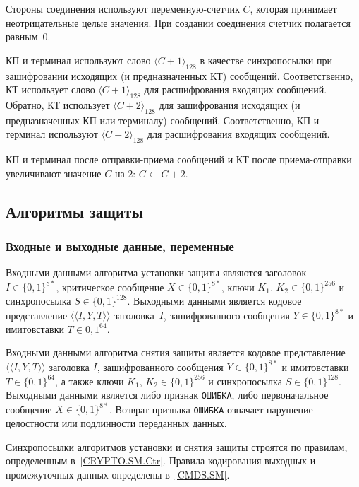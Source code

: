 Стороны соединения используют переменную-счетчик $C$, которая принимает 
неотрицательные целые значения. При создании соединения счетчик 
полагается равным~$0$.

КП и терминал используют слово $\langle C + 1 \rangle_{128}$ в качестве 
синхропосылки при зашифровании исходящих (и предназначенных КТ) сообщений. 
Соответственно, КТ использует слово $\langle C + 1 \rangle_{128}$ для 
расшифрования входящих сообщений. Обратно, КТ использует $\langle C + 2 
\rangle_{128}$ для зашифрования исходящих (и предназначенных КП или 
терминалу) сообщений. Соответственно, КП и терминал используют $\langle C + 2 
\rangle_{128}$ для расшифрования входящих сообщений. 

КП и терминал после отправки-приема сообщений и КТ после приема-отправки 
увеличивают значение $C$ на 2: $C\gets C + 2$.

\subsection{Алгоритмы защиты}\label{CRYPTO.SM.Algs}

\subsubsection{Входные и выходные данные, переменные}
\label{CRYPTO.SM.Algs.InOut}

Входными данными алгоритма установки защиты являются заголовок~$I\in\{0,1\}^{8*}$, 
критическое сообщение $X \in\{0,1\}^{8*}$, 
ключи $K_1$, $K_2\in\{0,1\}^{256}$ и 
синхропосылка $S\in\{0,1\}^{128}$.
Выходными данными является кодовое представление 
$\langle\langle I, Y, T \rangle\rangle$
заголовка~$I$, зашифрованного сообщения $Y \in\{0,1\}^{8*}$ 
и имитовставки $T \in {0,1}^{64}$.

Входными данными алгоритма снятия защиты является кодовое представление 
$\langle\langle I, Y, T\rangle\rangle$ заголовка $I$, зашифрованного 
сообщения $Y \in\{0,1\}^{8*}$ и имитовставки $T \in\{0, 1\}^{64}$, а также 
ключи $K_1$, $K_2 \in\{0,1\}^{256}$ и синхропосылка $S \in\{0,1\}^{128}$. 
Выходными данными является либо признак \texttt{ОШИБКА}, либо 
первоначальное сообщение $X \in\{0,1\}^{8*}$. 
Возврат признака \texttt{ОШИБКА} означает нарушение целостности или 
подлинности переданных данных.

Синхропосылки алгоритмов установки и снятия защиты строятся по правилам, 
определенным в~\ref{CRYPTO.SM.Ctr}. 
Правила кодирования выходных и промежуточных данных определены в~\ref{CMDS.SM}.

